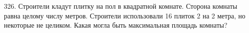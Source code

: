 326. Строители кладут плитку на пол в квадратной комнате. Сторона комнаты равна целому числу метров. Строители использовали 16 плиток 2 на 2 метра,
но некоторые не целиком. Какая могла быть максимальная площадь комнаты?\\
